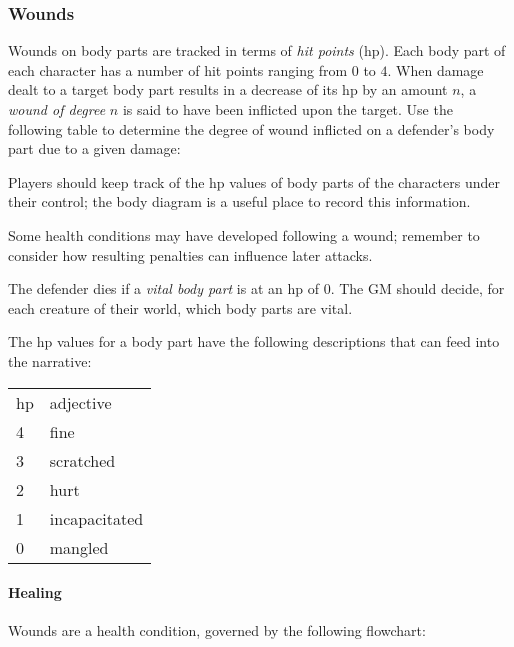 \documentclass[12pt]{article}
\newcommand{\emdex}[1]{\emph{#1}\index{#1}}
\begin{document}
\subsubsection{Wounds}\label{sec:wounds}

Wounds on body parts are tracked in terms of \emdex{hit points} (hp).
Each body part of each character has a number of hit points ranging from
$0$ to $4$.
When damage dealt to a target body part results in a decrease of its hp by an amount $n$, 
a \emph{wound of degree}
$n$ is said to have been inflicted upon the target.
Use the following table to determine the degree of wound inflicted on a defender's body part
due to a given damage:
\begin{center}

\end{center}
Players should keep track of the hp values of body parts of the characters under their control;
the body diagram is a useful place to record this information.

Some health conditions may have developed following a wound;
remember to consider how resulting penalties can influence later attacks.

The defender dies if a \emdex{vital body part} is at an hp of $0$.
The GM should decide, for each creature of their world, which body parts are vital.

The hp values for a body part have the following descriptions that can feed into the narrative:
\begin{center}
{\setlength{\extrarowheight}{1pt}
\begin{tabular}{l|l}
hp & adjective \\
\cline{1-2}
4  & fine \\
3  & scratched \\
2  & hurt \\
1  & incapacitated \\
0  & mangled
\end{tabular}}
\end{center}

\paragraph{Healing} Wounds are a health condition, governed by the following flowchart:
\end{document}
